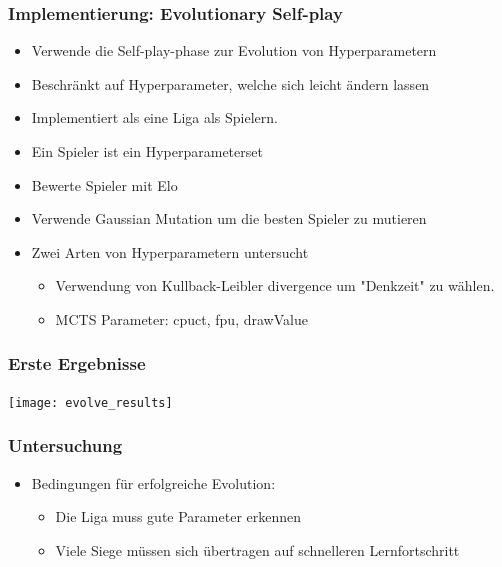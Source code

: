 \begin{frame}
 \frametitle{Implementierung: Evolutionary Self-play}
  


\begin{itemize}
  \item \pause Verwende die Self-play-phase zur Evolution von Hyperparametern
  \item \pause Beschränkt auf Hyperparameter, welche sich leicht ändern lassen
  \item \pause Implementiert als eine Liga als Spielern.
  \item \pause Ein Spieler ist ein Hyperparameterset
  \item \pause Bewerte Spieler mit Elo
  \item \pause Verwende Gaussian Mutation um die besten Spieler zu mutieren
\end{itemize}

\begin{itemize}
  \item \pause Zwei Arten von Hyperparametern untersucht
\begin{itemize}
  \item \pause Verwendung von Kullback-Leibler divergence um "Denkzeit" zu wählen.
  \item \pause MCTS Parameter: cpuct, fpu, drawValue
\end{itemize}
\end{itemize}

  
\end{frame}
\begin{frame}
 \frametitle{Erste Ergebnisse}
  


\center \texttt{[image: evolve\_results]}

  
\end{frame}
\begin{frame}
 \frametitle{Untersuchung}
  


\begin{itemize}
  \item \pause Bedingungen für erfolgreiche Evolution:
\begin{itemize}
  \item \pause Die Liga muss gute Parameter erkennen
  \item \pause Viele Siege müssen sich übertragen auf schnelleren Lernfortschritt
\end{itemize}
\end{itemize}

  
\end{frame}
